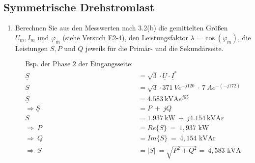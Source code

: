 \subsection{Symmetrische Drehstromlast}
\begin{enumerate}[label=\alph*)]

	\item Berechnen Sie aus den Messwerten nach 3.2(b) die gemittelten Größen $U_m, I_m
		      \text{ und } \varphi_m$ (siehe Versuch E2-4), den Leistungsfaktor $\lambda =
		      \cos(\varphi_m)$, die Leistungen $S, P \text{ und } Q$ jeweils für die Primär-
	      und die Sekundärseite.

	      \begin{center}
		      \begin{align*}
			      \text{Bsp. der Phase 2 der Eingangsseite:}                                                                          \\
			      \underline{S}                 & = \sqrt{3}\cdot\underline{U}\cdot\underline{I}^*                                    \\
			      \underline{S}                 & = \sqrt{3}\cdot 371\ Ve^{-j120}\ \cdot\ 7\ Ae^{-(-j172)}                            \\
			      \underline{S}                 & = \SI{4,583}{\kilo\volt\ampere}e^{j65}                                              \\
			      \Longrightarrow \underline{S} & =  P\ +\ jQ                                                                         \\
			      \underline{S}                 & = \SI{1,937}{\kilo\watt}\ +\ j\SI{4,154}{\kilo\volt\ampere r}                       \\
			      \Longrightarrow\ P            & = Re{\{S\}}\                                                   =\ 1,937\text{ kW}   \\
			      \Longrightarrow\ Q            & = Im{\{S\}}\                                                   =\ 4,154\text{ kVAr} \\
			      \Longrightarrow\ S            & =  \left\lvert {\underline{S}}  \right\rvert\ = \sqrt{P^2+Q^2} =\ 4,583\text{ kVA}  \\               \\
		      \end{align*}
	      \end{center}


\end{enumerate}
